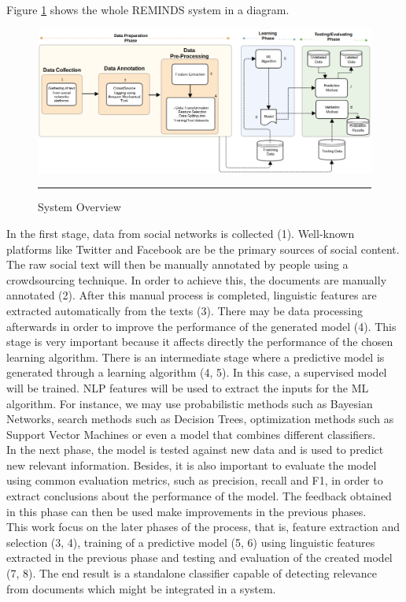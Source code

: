 Figure \ref{fig:system-view} shows the whole REMINDS system in a diagram.

\begin{figure}

  	\includegraphics[scale=0.6]{./Figures/system-view/system-overview.png}
  	\rule{24cm}{0.5pt}
	\caption[System Overview]{System Overview}
	\label{fig:system-view}

\end{figure}

In the first stage, data from social networks is collected (1). Well-known platforms like Twitter and Facebook are be the primary sources of social content. The raw social text will then be manually annotated by people using a crowdsourcing technique. In order to achieve this, the documents are manually annotated (2). After this manual process is completed, linguistic features are extracted automatically from the texts (3). There may be data processing afterwards in order to improve the performance of the generated model (4). This stage is very important because it affects directly the performance of the chosen learning algorithm. There is an intermediate stage where a predictive model is generated through a learning algorithm (4, 5). In this case, a supervised model will be trained. NLP features will be used to extract the inputs for the ML algorithm. For instance, we may use probabilistic methods such as Bayesian Networks, search methods such as Decision Trees, optimization methods such as Support Vector Machines or even a model that combines different classifiers. \\
In the next phase, the model is tested against new data and is used to predict new relevant information. Besides, it is also important to evaluate the model using common evaluation metrics, such as precision, recall and F1, in order to extract conclusions about the performance of the model. The feedback obtained in this phase can then be used make improvements in the previous phases.\\
This work focus on the later phases of the process, that is, feature extraction and selection (3, 4), training of a predictive model (5, 6) using linguistic features extracted in the previous phase and testing and evaluation of the created model (7, 8).
The end result is a standalone classifier capable of detecting relevance from documents which might be integrated in a system.  

